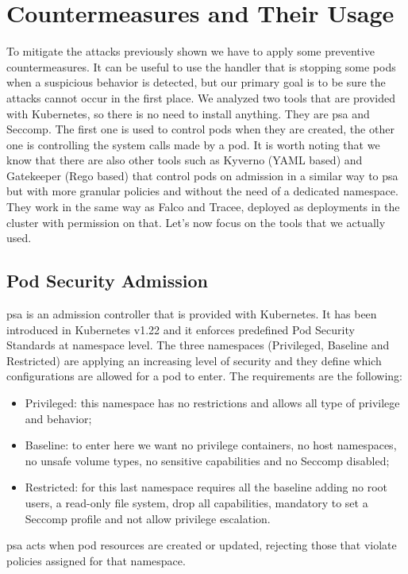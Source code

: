 \section{Countermeasures and Their Usage}
\label{sec:countermeaseres}

To mitigate the attacks previously shown we have to apply some preventive countermeasures. It can be useful to use the handler that is stopping some pods when a suspicious behavior is detected, but our primary goal is to be sure the attacks cannot occur in the first place. We analyzed two tools that are provided with Kubernetes, so there is no need to install anything. They are \acrlong{psa} and Seccomp. The first one is used to control pods when they are created, the other one is controlling the system calls made by a pod. It is worth noting that we know that there are also other tools such as Kyverno (YAML based) and Gatekeeper (Rego based) that control pods on admission in a similar way to \ac{psa} but with more granular policies and without the need of a dedicated namespace. They work in the same way as Falco and Tracee, deployed as deployments in the cluster with permission on that. Let's now focus on the tools that we actually used.


\subsection{Pod Security Admission}
\Acrlong{psa} is an admission controller that is provided with Kubernetes. It has been introduced in Kubernetes v1.22 and it enforces predefined Pod Security Standards at namespace level. The three namespaces (Privileged, Baseline and Restricted) are applying an increasing level of security and they define which configurations are allowed for a pod to enter. The requirements are the following:
\begin{itemize}
    \item Privileged: this namespace has no restrictions and allows all type of privilege and behavior;
    \item Baseline: to enter here we want no privilege containers, no host namespaces, no unsafe volume types, no sensitive capabilities and no Seccomp disabled;
    \item Restricted: for this last namespace requires all the baseline adding no root users, a read-only file system, drop all capabilities, mandatory to set a Seccomp profile and not allow privilege escalation.
\end{itemize}
\Ac{psa} acts when pod resources are created or updated, rejecting those that violate policies assigned for that namespace.

